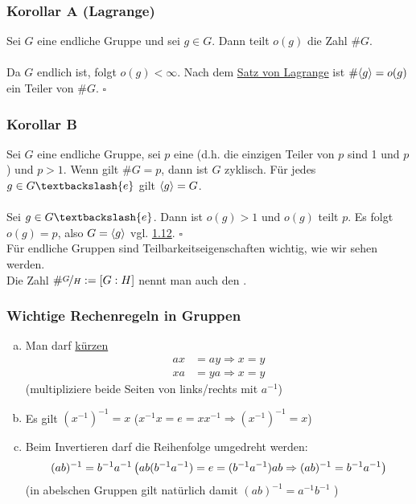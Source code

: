 \subsubsection*{Korollar A (Lagrange)}
Sei $G$ eine endliche Gruppe und sei $g\in G$. Dann teilt $o(g)$ die Zahl $\#G$.\\

\\
Da $G$ endlich ist, folgt $o(g)<\infty$. Nach dem \hyperref[sub:satz_von_lagrange]{Satz von Lagrange} ist $\#\langle g \rangle=o(g)$ ein Teiler von $\#G$.
\hfill $\square$

\subsubsection*{Korollar B}
Sei $G$ eine endliche Gruppe, sei $p$ eine   (d.h. die einzigen Teiler von $p$ sind 1 und $p$) und $p>1$. Wenn gilt $\#G=p$, dann ist $G$ zyklisch. Für jedes $g\in G \textbackslash\{e\}$ gilt $\langle g \rangle=G$.\\

\\
Sei $g \in G\textbackslash\{e\}$. Dann ist $o(g)>1$ und $o(g)$ teilt $p$. Es folgt $o(g)=p$, also $G=\langle g \rangle$ vgl. \hyperref[sub:zyklische_gruppen]{1.12}.
\hfill $\square$\\

Für endliche Gruppen sind Teilbarkeitseigenschaften wichtig, wie wir sehen werden.\\
Die Zahl $\#\nicefrac{G}{H}:=[G:H]$ nennt man auch den .

\subsubsection*{Wichtige Rechenregeln in Gruppen}
\begin{enumerate}[(a)]
	\item Man darf \uline{kürzen}
	\begin{equation*}
	\begin{aligned}
		ax &= ay \Rightarrow x=y\\
		xa &= ya \Rightarrow x=y
	\end{aligned}
	\end{equation*}
	(multipliziere beide Seiten von links/rechts mit $a^{-1}$)
	\item Es gilt $(x^{-1})^{-1}=x$   ($x^{-1}x=e=xx^{-1} \Rightarrow (x^{-1})^{-1}=x$)
	\item Beim Invertieren darf die Reihenfolge umgedreht werden:\\
	\[(ab)^{-1}=b^{-1}a^{-1}\\
	\left( ab(b^{-1}a^{-1})=e=(b^{-1}a^{-1})ab \Rightarrow (ab)^{-1}=b^{-1}a^{-1}\right)
	\]
	(in abelschen Gruppen gilt natürlich damit $(ab)^{-1}=a^{-1}b^{-1}$ )
\end{enumerate}
